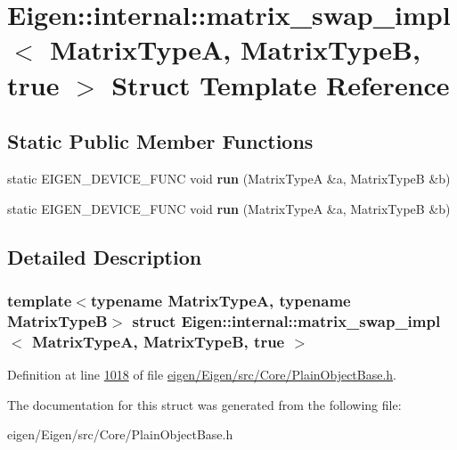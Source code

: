 \hypertarget{struct_eigen_1_1internal_1_1matrix__swap__impl_3_01_matrix_type_a_00_01_matrix_type_b_00_01true_01_4}{}\section{Eigen\+:\+:internal\+:\+:matrix\+\_\+swap\+\_\+impl$<$ Matrix\+TypeA, Matrix\+TypeB, true $>$ Struct Template Reference}
\label{struct_eigen_1_1internal_1_1matrix__swap__impl_3_01_matrix_type_a_00_01_matrix_type_b_00_01true_01_4}
\subsection*{Static Public Member Functions}
\begin{DoxyCompactItemize}
\item 
\mbox{\label{struct_eigen_1_1internal_1_1matrix__swap__impl_3_01_matrix_type_a_00_01_matrix_type_b_00_01true_01_4_a3ec52e3286dacdf734615e55258bbfee}} 
static E\+I\+G\+E\+N\+\_\+\+D\+E\+V\+I\+C\+E\+\_\+\+F\+U\+NC void {\bfseries run} (Matrix\+TypeA \&a, Matrix\+TypeB \&b)
\item 
\mbox{\label{struct_eigen_1_1internal_1_1matrix__swap__impl_3_01_matrix_type_a_00_01_matrix_type_b_00_01true_01_4_a3ec52e3286dacdf734615e55258bbfee}} 
static E\+I\+G\+E\+N\+\_\+\+D\+E\+V\+I\+C\+E\+\_\+\+F\+U\+NC void {\bfseries run} (Matrix\+TypeA \&a, Matrix\+TypeB \&b)
\end{DoxyCompactItemize}


\subsection{Detailed Description}
\subsubsection*{template$<$typename Matrix\+TypeA, typename Matrix\+TypeB$>$\newline
struct Eigen\+::internal\+::matrix\+\_\+swap\+\_\+impl$<$ Matrix\+Type\+A, Matrix\+Type\+B, true $>$}



Definition at line \hyperlink{eigen_2_eigen_2src_2_core_2_plain_object_base_8h_source_l01018}{1018} of file \hyperlink{eigen_2_eigen_2src_2_core_2_plain_object_base_8h_source}{eigen/\+Eigen/src/\+Core/\+Plain\+Object\+Base.\+h}.



The documentation for this struct was generated from the following file\+:\begin{DoxyCompactItemize}
\item 
eigen/\+Eigen/src/\+Core/\+Plain\+Object\+Base.\+h\end{DoxyCompactItemize}
